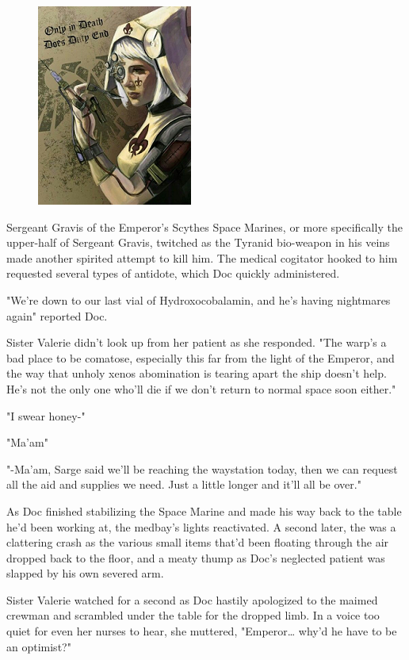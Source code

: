 \begin{figure}
	\begin{center}
		\includegraphics[width=\figwidth]{pics/13/2.png}
	\end{center}
\end{figure}
Sergeant Gravis of the Emperor's Scythes Space Marines, or more specifically the upper-half of Sergeant Gravis, twitched as the Tyranid bio-weapon in his veins made another spirited attempt to kill him. 
The medical cogitator hooked to him requested several types of antidote, which Doc quickly administered.

"We're down to our last vial of Hydroxocobalamin, and he's having nightmares again" reported Doc. 


Sister Valerie didn't look up from her patient as she responded. 
"The warp's a bad place to be comatose, especially this far from the light of the Emperor, and the way that unholy xenos abomination is tearing apart the ship doesn't help. 
He's not the only one who'll die if we don't return to normal space soon either."

"I swear honey-" 

"Ma'am" 

"-Ma'am, Sarge said we'll be reaching the waystation today, then we can request all the aid and supplies we need. 
Just a little longer and it'll all be over."

As Doc finished stabilizing the Space Marine and made his way back to the table he'd been working at, the medbay's lights reactivated. 
A second later, the was a clattering crash as the various small items that'd been floating through the air dropped back to the floor, and a meaty thump as Doc's neglected patient was slapped by his own severed arm.

Sister Valerie watched for a second as Doc hastily apologized to the maimed crewman and scrambled under the table for the dropped limb. 
In a voice too quiet for even her nurses to hear, she muttered, "Emperor… why'd he have to be an optimist?"

